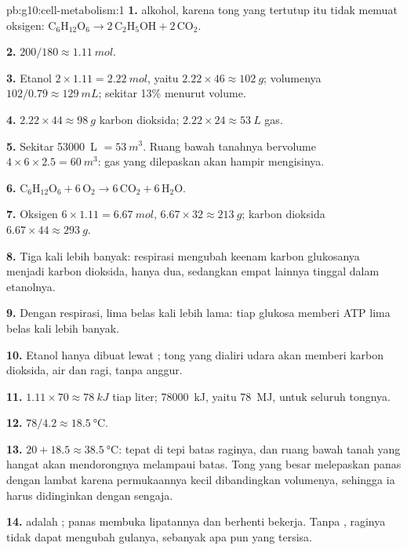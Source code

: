 \begin{solution}{pb:g10:cell-metabolism:1}
\textbf{1.}  alkohol, karena tong yang tertutup itu tidak
memuat oksigen: $\mathrm{C_6H_{12}O_6} \to 2\,\mathrm{C_2H_5OH} +
2\,\mathrm{CO_2}$.

\textbf{2.} $200/180 \approx \qty{1.11}{mol}$.

\textbf{3.} Etanol $2 \times 1.11 = \qty{2.22}{mol}$, yaitu $2.22
\times 46 \approx \qty{102}{g}$; volumenya $102/0.79 \approx
\qty{129}{mL}$; sekitar 13\% menurut volume.

\textbf{4.} $2.22 \times 44 \approx \qty{98}{g}$ karbon dioksida;
$2.22 \times 24 \approx \qty{53}{L}$ gas.

\textbf{5.} Sekitar \qty{53000}{L} $= \qty{53}{m^3}$. Ruang bawah
tanahnya bervolume $4 \times 6 \times 2.5 = \qty{60}{m^3}$: gas yang
dilepaskan akan hampir mengisinya.

\textbf{6.} $\mathrm{C_6H_{12}O_6} + 6\,\mathrm{O_2} \to
6\,\mathrm{CO_2} + 6\,\mathrm{H_2O}$.

\textbf{7.} Oksigen $6 \times 1.11 = \qty{6.67}{mol}$, $6.67 \times 32
\approx \qty{213}{g}$; karbon dioksida $6.67 \times 44 \approx
\qty{293}{g}$.

\textbf{8.} Tiga kali lebih banyak: respirasi mengubah keenam karbon
glukosanya menjadi karbon dioksida,  hanya dua, sedangkan
empat lainnya tinggal dalam etanolnya.

\textbf{9.} Dengan respirasi, lima belas kali lebih lama: tiap glukosa
memberi ATP lima belas kali lebih banyak.

\textbf{10.} Etanol hanya dibuat lewat ; tong yang dialiri
udara akan memberi karbon dioksida, air dan ragi, tanpa anggur.

\textbf{11.} $1.11 \times 70 \approx \qty{78}{kJ}$ tiap liter;
\qty{78000}{kJ}, yaitu \qty{78}{MJ}, untuk seluruh tongnya.

\textbf{12.} $78/4.2 \approx \qty{18.5}{\celsius}$.

\textbf{13.} $20 + 18.5 \approx \qty{38.5}{\celsius}$: tepat di tepi
batas raginya, dan ruang bawah tanah yang hangat akan mendorongnya
melampaui batas. Tong yang besar melepaskan panas dengan lambat karena
permukaannya kecil dibandingkan volumenya, sehingga ia harus
didinginkan dengan sengaja.

\textbf{14.}  adalah ; panas membuka lipatannya dan
 berhenti bekerja. Tanpa , raginya tidak dapat mengubah
gulanya, sebanyak apa pun yang tersisa.


\end{solution}
